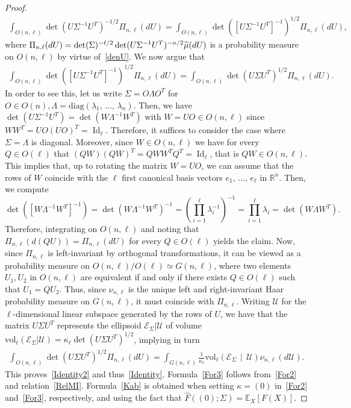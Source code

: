 \documentclass[AHL,Unicode,longabstracts,published]{cedram}
\DeclareMathOperator{\Id}{Id}
\newcommand{\scU}{\mathscr{U}}
\newcommand{\diag}{\mathrm{diag}}
\newcommand{\rvol}{\mathrm{vol}}
\newcommand{\clE}{\mathcal{E}}
\newcommand{\R}{\mathbb{R}}
\newcommand{\EX}[2]{\mathbb{E}_{#1}\left[#2\right]}
\let\oldtilde\tilde
\renewcommand*{\tilde}[1]{\mathchoice{\widetilde{#1}}{\widetilde{#1}}{\oldtilde{#1}}{\oldtilde{#1}}}
\begin{document}
\begin{proof}
\begin{gather*}
\int_{O(n,\ell)} \det\left(U\Sigma^{-1}U^T\right)^{-1/2} \Pi_{n,\ell}(dU) = \int_{O(n,\ell)} \det\left(\left[U\Sigma^{-1}U^T\right]^{-1}\right)^{1/2} \Pi_{n,\ell}(dU),
\end{gather*}
where $\Pi_{n,\ell}(dU)= \det(\Sigma)^{-\ell/2} \det(U\Sigma^{-1}U^T)^{-n/2}\tilde{\mu}(dU) $ is a probability measure on $O(n,\ell)$ by virtue of~\eqref{denU}. We now argue that
\begin{gather*}
\int_{O(n,\ell)} \det\left(\left[U\Sigma^{-1}U^T\right]^{-1}\right)^{1/2} \Pi_{n,\ell}(dU) = \int_{O(n,\ell)} \det\left(U \Sigma U^T\right)^{1/2} \Pi_{n,\ell}(dU).
\end{gather*}
In order to see this, let us write $\Sigma = O \Lambda O^T$ for $O \in O(n), \Lambda=\diag(\lambda_1,\,\ldots,\,\lambda_n)$. Then, we have $\det(U\Sigma^{-1}U^T) = \det(W \Lambda^{-1} W^T) $ with $W=UO \in O(n,\ell)$ since $WW^T = UO(UO)^T= \Id_{\ell}$. Therefore, it suffices to consider the case where $\Sigma=\Lambda$ is diagonal. Moreover, since $W \in O(n,\ell)$ we have for every $Q\in O(\ell)$ that $(QW)(QW)^T=QWW^TQ^T=\Id_{\ell}$, that is $QW \in O(n,\ell)$. This implies that, up to rotating the matrix $W=UO$, we can assume that the rows of $W$ coincide with the $\ell$ first canonical basis vectors $e_1,\,\ldots,\,e_{\ell}$ in $\R^n$. Then, we compute
\[
\det\left(\left[W \Lambda^{-1} W^T\right]^{-1}\right) = \det\left(W\Lambda^{-1} W^T\right)^{-1} = \left(\prod_{i=1}^{\ell}\lambda_i^{-1}\right)^{-1} = \prod_{i=1}^{\ell}\lambda_i = \det\left(W\Lambda W^T\right).
\]
Therefore, integrating on $O(n,\ell)$ and noting that $\Pi_{n,\ell}(d(QU))=\Pi_{n,\ell}(dU)$ for every $Q \in O(\ell)$ yields the claim. Now, since $\Pi_{n,\ell}$ is left-invariant by orthogonal transformations, it can be viewed as a probability measure on $O(n,\ell)/O(\ell) \simeq G(n,\ell)$, where two elements $U_1,U_2$ in $O(n,\ell)$ are equivalent if and only if there exists $Q\in O(\ell)$ such that $U_1=QU_2$. Thus, since $\nu_{n,\ell}$ is the unique left and right-invariant Haar probability measure on $G(n,\ell)$, it must coincide with $\Pi_{n,\ell}$. Writing $\scU$ for the $\ell$-dimensional linear subspace generated by the rows of $U$, we have that the matrix $U\Sigma U^T$ represents the ellipsoid $\clE_{\Sigma}|\scU$ of volume $\rvol_{\ell}(\clE_{\Sigma}|\scU)=\kappa_{\ell}\det(U\Sigma U^T)^{1/2}$, implying in turn
\begin{gather*}
\int_{O(n,\ell)} \det\left(U \Sigma U^T\right)^{1/2} \Pi_{n,\ell}(dU) = \int_{G(n,\ell)} \frac{1}{\kappa_{\ell}} \rvol_{\ell}\left(\clE_{\Sigma}\,\middle|\,\scU\right) \nu_{n,\ell}(d\scU).
\end{gather*}
This proves~\eqref{Identity2} and thus~\eqref{Identity}. Formula~\eqref{For3} follows from~\eqref{For2} and relation~\eqref{RelMI}. Formula~\eqref{Kab} is obtained when setting $\kappa=(0)$ in~\eqref{For2} and~\eqref{For3}, respectively, and using the fact that $\widehat{F}((0);\Sigma)=\EX{X}{F(X)}$.
\end{proof}
\end{document}
